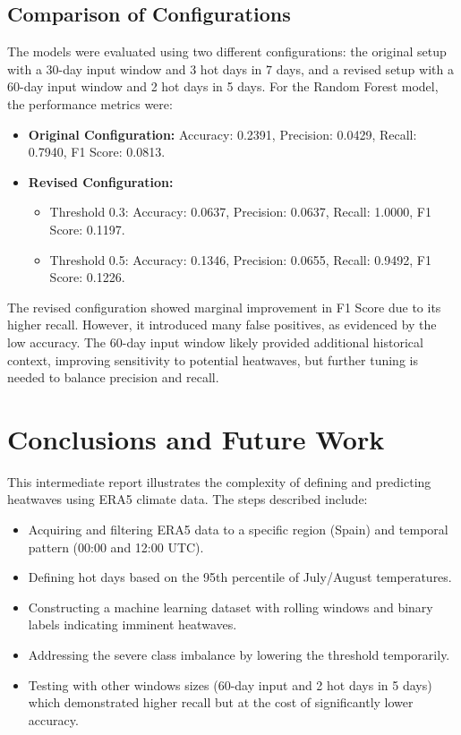 \documentclass[12pt,a4paper]{article}
\begin{document}
\subsection{Comparison of Configurations}
The models were evaluated using two different configurations: the original setup with a 30-day input window and 3 hot days in 7 days, and a revised setup with a 60-day input window and 2 hot days in 5 days. For the Random Forest model, the performance metrics were:

\begin{itemize}
    \item \textbf{Original Configuration:} Accuracy: 0.2391, Precision: 0.0429, Recall: 0.7940, F1 Score: 0.0813.
    \item \textbf{Revised Configuration:}
    \begin{itemize}
        \item Threshold 0.3: Accuracy: 0.0637, Precision: 0.0637, Recall: 1.0000, F1 Score: 0.1197.
        \item Threshold 0.5: Accuracy: 0.1346, Precision: 0.0655, Recall: 0.9492, F1 Score: 0.1226.
    \end{itemize}
\end{itemize}

The revised configuration showed marginal improvement in F1 Score due to its higher recall. However, it introduced many false positives, as evidenced by the low accuracy. The 60-day input window likely provided additional historical context, improving sensitivity to potential heatwaves, but further tuning is needed to balance precision and recall.


\section{Conclusions and Future Work}
This intermediate report illustrates the complexity of defining and predicting heatwaves using ERA5 climate data. The steps described include:
\begin{itemize}
    \item Acquiring and filtering ERA5 data to a specific region (Spain) and temporal pattern (00:00 and 12:00 UTC).
    \item Defining hot days based on the 95th percentile of July/August temperatures.
    \item Constructing a machine learning dataset with rolling windows and binary labels indicating imminent heatwaves.
    \item Addressing the severe class imbalance by lowering the threshold temporarily.
    \item Testing with other windows sizes (60-day input and 2 hot days in 5 days) which demonstrated higher recall but at the cost of significantly lower accuracy.
\end{itemize}
\end{document}
